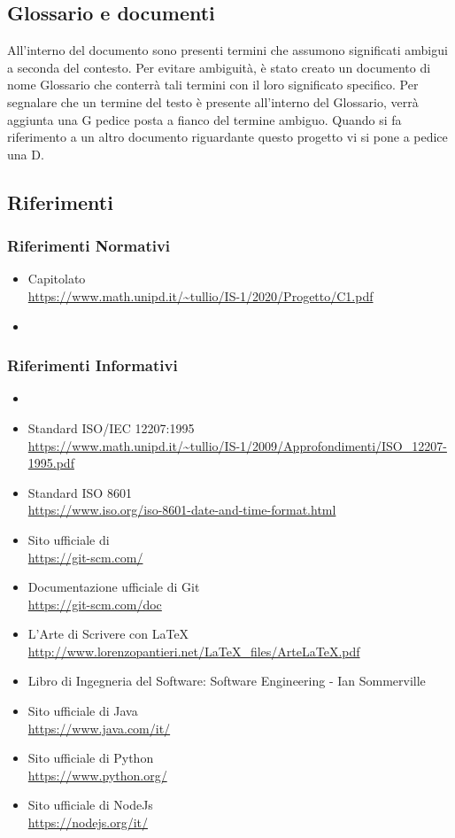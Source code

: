 \subsection{Glossario e documenti} 
All'interno del  documento sono presenti termini che assumono significati ambigui a seconda del contesto.
Per evitare ambiguità, è stato creato un  documento di nome Glossario che  conterrà tali termini con il loro significato specifico. Per segnalare che un termine del testo è presente all'interno del Glossario, verrà aggiunta una G pedice posta a fianco del termine ambiguo.
Quando si fa riferimento a un altro documento riguardante questo progetto vi si pone a pedice una D.

\subsection{Riferimenti}
\subsubsection{Riferimenti Normativi}
\begin{itemize}
\item{Capitolato \\
\url{https://www.math.unipd.it/~tullio/IS-1/2020/Progetto/C1.pdf}}
\item {}
\end{itemize}

\subsubsection{Riferimenti Informativi}
\begin{itemize}
\item {}
\item{Standard ISO/IEC 12207:1995 \\
\url{https://www.math.unipd.it/~tullio/IS-1/2009/Approfondimenti/ISO_12207-1995.pdf}}
\item{Standard ISO 8601 \\
	\url{https://www.iso.org/iso-8601-date-and-time-format.html}}
\item{Sito ufficiale di  \\
\url{https://git-scm.com/}}
\item{Documentazione ufficiale di Git} \\
\url{https://git-scm.com/doc}
\item{L’Arte di Scrivere con \LaTeX \\
\url{http://www.lorenzopantieri.net/LaTeX_files/ArteLaTeX.pdf}}
\item{Libro di Ingegneria del Software: Software Engineering - Ian Sommerville}
\item{Sito ufficiale di Java} \\
\url{https://www.java.com/it/}
\item{Sito ufficiale di Python} \\
\url{https://www.python.org/}
\item{Sito ufficiale di NodeJs} \\
\url{https://nodejs.org/it/}
\end{itemize}
